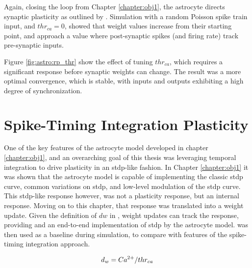 Again, closing the loop from Chapter \ref{chapter:obj1}, the astrocyte directs
synaptic plasticity as outlined by . Simulation with a
random Poisson spike train input, and $thr_{ca}=0$, showed that weight values
increase from their starting point, and approach a value where post-synaptic
spikes (and firing rate) track pre-synaptic inputs.



Figure \ref{fig:astro:rp_thr} show the effect of tuning $thr_{ca}$, which
requires a significant \ca response before synaptic weights can change. The
result was a more optimal convergence, which is stable, with inputs and outputs
exhibiting a high degree of synchronization.


\section{Spike-Timing Integration Plasticity}

One of the key features of the astrocyte model developed in chapter
\ref{chapter:obj1}, and an overarching goal of this thesis was leveraging
temporal integration to drive plasticity in an \gls{stdp}-like fashion. In
Chapter \ref{chapter:obj1} it was shown that the astrocyte model is capable of
implementing the classic \gls{stdp} curve, common variations on \gls{stdp}, and
low-level modulation of the \gls{stdp} curve. This \gls{stdp}-like response
however, was not a plasticity response, but an internal \ca response. Moving on
to this chapter, that \ca response was translated into a weight
update. Given the definition of $dw$ in , weight updates can
track the \ca response, providing and an end-to-end implementation of \gls{stdp}
by the astrocyte model.  was then used as a baseline during
simulation, to compare with features of the spike-timing integration approach.

\begin{align}
  d_w = Ca^{2+} / thr_{ca}  \label{eq:dw-classic}
\end{align}

